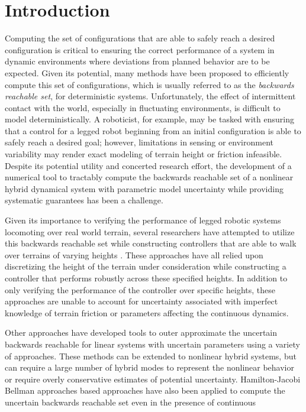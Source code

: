 \section{Introduction}
  
Computing the set of configurations that are able to safely reach a desired configuration is critical to ensuring the correct performance of a system in dynamic environments where deviations from planned behavior are to be expected.
Given its potential, many methods have been proposed to efficiently compute this set of configurations, which is usually referred to as the \emph{backwards reachable set}, for deterministic systems.
Unfortunately, the effect of intermittent contact with the world, especially in fluctuating environments, is difficult to model deterministically. 
A roboticist, for example, may be tasked with ensuring that a control for a legged robot beginning from an initial configuration is able to safely reach a desired goal; however, limitations in sensing or environment variability may render exact modeling of terrain height or friction infeasible.
Despite its potential utility and concerted research effort, the development of a numerical tool to tractably compute the backwards reachable set of a nonlinear hybrid dynamical system with parametric model uncertainty while providing systematic guarantees has been a challenge. 

Given its importance to verifying the performance of legged robotic systems locomoting over real world terrain, several researchers have attempted to utilize this backwards reachable set while constructing controllers that are able to walk over terrains of varying heights \cite{byl2008metastable,dai2012optimizing,griffin2015,saglam2013switching}. 
These approaches have all relied upon discretizing the height of the terrain under consideration while constructing a controller that performs robustly across these specified heights.
In addition to only verifying the performance of the controller over specific heights, these approaches are unable to account for uncertainty associated with imperfect knowledge of terrain friction or parameters affecting the continuous dynamics.

Other approaches have developed tools to outer approximate the uncertain backwards reachable for linear systems with uncertain parameters using a variety of approaches. 
These methods can be extended to nonlinear hybrid systems, but can require a large number of hybrid modes to represent the nonlinear behavior or require overly conservative estimates of potential uncertainty. 
Hamilton-Jacobi Bellman approaches based approaches have also been applied to compute the uncertain backwards reachable set even in the presence of continuous  

